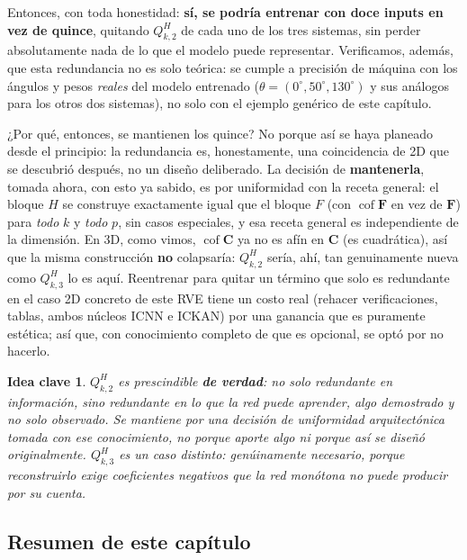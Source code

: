 \documentclass[11pt,a4paper]{article}
\newtheorem{takeaway}{Idea clave}
\newcommand{\Cof}{\operatorname{cof}}
\begin{document}
Entonces, con toda honestidad: \textbf{s\'i, se podr\'ia entrenar con
doce inputs en vez de quince}, quitando $Q_{k,2}^H$ de cada uno de los
tres sistemas, sin perder absolutamente nada de lo que el modelo puede
representar. Verificamos, adem\'as, que esta redundancia no es solo
te\'orica: se cumple a precisi\'on de m\'aquina con los \'angulos y
pesos \emph{reales} del modelo entrenado
($\theta=(0^\circ,50^\circ,130^\circ)$ y sus an\'alogos para los otros
dos sistemas), no solo con el ejemplo gen\'erico de este cap\'itulo.

¿Por qu\'e, entonces, se mantienen los quince? No porque as\'i se
haya planeado desde el principio: la redundancia es, honestamente,
una coincidencia de 2D que se descubri\'o despu\'es, no un dise\~no
deliberado. La decisi\'on de \textbf{mantenerla}, tomada ahora, con
esto ya sabido, es por uniformidad con la receta general: el bloque
$H$ se construye exactamente igual que el bloque $F$ (con $\Cof\bm F$
en vez de $\bm F$) para \emph{todo} $k$ y \emph{todo} $p$, sin casos
especiales, y esa receta general es independiente de la dimensi\'on.
En 3D, como vimos, $\Cof\bm C$ ya no es af\'in en $\bm C$
(es cuadr\'atica), as\'i que la misma construcci\'on \textbf{no}
colapsar\'ia: $Q_{k,2}^H$ ser\'ia, ah\'i, tan genuinamente nueva como
$Q_{k,3}^H$ lo es aqu\'i. Reentrenar para quitar un t\'ermino que solo
es redundante en el caso 2D concreto de este RVE tiene un costo real
(rehacer verificaciones, tablas, ambos n\'ucleos ICNN e ICKAN) por una
ganancia que es puramente est\'etica; as\'i que, con conocimiento
completo de que es opcional, se opt\'o por no hacerlo.

\begin{takeaway}
$Q_{k,2}^H$ es prescindible \textbf{de verdad}: no solo redundante en
informaci\'on, sino redundante en lo que la red puede aprender, algo
demostrado y no solo observado. Se mantiene por una decisi\'on de
uniformidad arquitect\'onica tomada con ese conocimiento, no porque
aporte algo ni porque as\'i se dise\~n\'o originalmente. $Q_{k,3}^H$ es
un caso distinto: gen\'uinamente necesario, porque reconstruirlo exige
coeficientes negativos que la red mon\'otona no puede producir por su
cuenta.
\end{takeaway}

\subsection{Resumen de este cap\'itulo}
\end{document}
